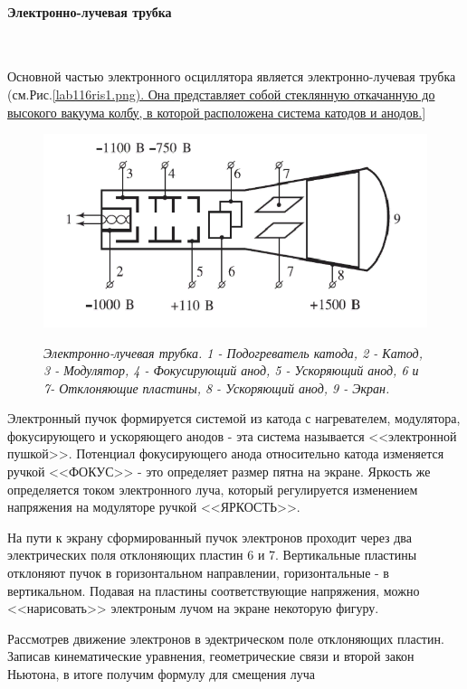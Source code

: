 \documentclass[a4paper,12pt]{report}
\begin{document}
	\paragraph{\Large Электронно-лучевая трубка } \text{ }
	\\
	\text\par{	Основной частью электронного осциллятора является электронно-лучевая трубка (см.Рис.\ref{lab116ris1.png). Она представляет собой стеклянную откачанную до высокого вакуума колбу, в которой расположена система катодов и анодов.} 
	
	\begin{figure}[h!]
	\begin{center}
	\includegraphics[scale=0.7]{lab116ris1.png} \label{lab116ris1.png}
	\end{center}
	
	\caption{\textit{Электронно-лучевая трубка. 1 - Подогреватель катода, 2 - Катод, 3 - Модулятор, 4 - Фокусирующий анод, 5 - Ускоряющий анод, 6 и 7- Отклоняющие пластины, 8 - Ускоряющий анод, 9 - Экран.}} \label{ris1}
	\end{figure}

	\text\par{Электронный пучок формируется системой из катода с нагревателем, модулятора, фокусирующего и ускоряющего анодов - эта система называется <<электронной пушкой>>. Потенциал фокусирующего анода относительно катода изменяется ручкой <<ФОКУС>> - это определяет размер пятна на экране. Яркость же определяется током электронного луча, который регулируется изменением напряжения на модуляторе ручкой <<ЯРКОСТЬ>>.}
	\\
	\text\par{	На пути к экрану сформированный пучок электронов проходит через два электрических поля отклоняющих пластин 6 и 7. Вертикальные пластины отклоняют пучок в горизонтальном направлении, горизонтальные - в вертикальном. Подавая на пластины соответствующие напряжения, можно <<нарисовать>> электроным лучом на экране некоторую фигуру.}	
	\\
	\text\par{	Рассмотрев движение электронов в эдектрическом поле отклоняющих пластин. Записав кинематические уравнения, геометрические связи и второй закон Ньютона, в итоге получим формулу для смещения луча}
	
}
\end{document}
